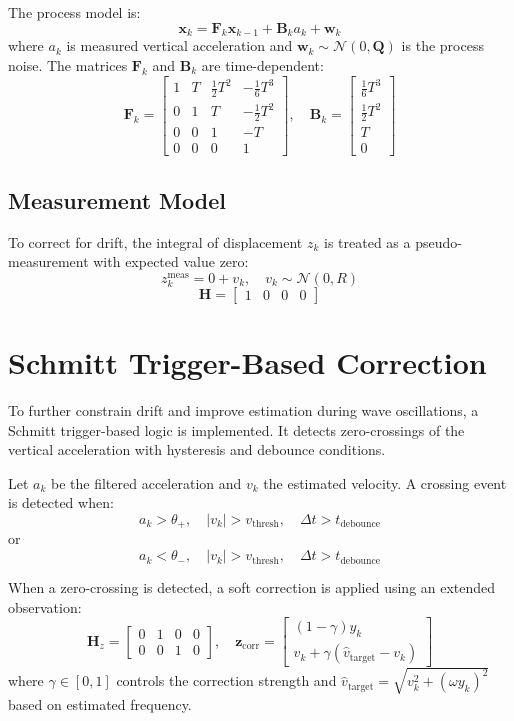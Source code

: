 \documentclass[12pt,letterpaper]{article}
\begin{document}
The process model is:
\[
\mathbf{x}_k = \mathbf{F}_k \mathbf{x}_{k-1} + \mathbf{B}_k a_k + \mathbf{w}_k
\]
where \( a_k \) is measured vertical acceleration and \( \mathbf{w}_k \sim \mathcal{N}(0, \mathbf{Q}) \) is the process noise. The matrices \( \mathbf{F}_k \) and \( \mathbf{B}_k \) are time-dependent:
\[
\mathbf{F}_k =
\begin{bmatrix}
1 & T & \frac{1}{2}T^2 & -\frac{1}{6}T^3 \\
0 & 1 & T & -\frac{1}{2}T^2 \\
0 & 0 & 1 & -T \\
0 & 0 & 0 & 1
\end{bmatrix}, \quad
\mathbf{B}_k =
\begin{bmatrix}
\frac{1}{6}T^3 \\
\frac{1}{2}T^2 \\
T \\
0
\end{bmatrix}
\]

\subsection{Measurement Model}
To correct for drift, the integral of displacement \( z_k \) is treated as a pseudo-measurement with expected value zero:
\[
z_k^\text{meas} = 0 + v_k, \quad v_k \sim \mathcal{N}(0, R)
\]
\[
\mathbf{H} = \begin{bmatrix} 1 & 0 & 0 & 0 \end{bmatrix}
\]

\section{Schmitt Trigger-Based Correction}
To further constrain drift and improve estimation during wave oscillations, a Schmitt trigger-based logic is implemented. It detects zero-crossings of the vertical acceleration with hysteresis and debounce conditions.

Let \( a_k \) be the filtered acceleration and \( v_k \) the estimated velocity. A crossing event is detected when:
\[
a_k > \theta_{+}, \quad |v_k| > v_\text{thresh}, \quad \Delta t > t_\text{debounce}
\]
or
\[
a_k < \theta_{-}, \quad |v_k| > v_\text{thresh}, \quad \Delta t > t_\text{debounce}
\]

When a zero-crossing is detected, a soft correction is applied using an extended observation:
\[
\mathbf{H}_z =
\begin{bmatrix}
0 & 1 & 0 & 0 \\
0 & 0 & 1 & 0
\end{bmatrix}, \quad
\mathbf{z}_\text{corr} =
\begin{bmatrix}
(1 - \gamma)y_k \\
v_k + \gamma(\hat{v}_\text{target} - v_k)
\end{bmatrix}
\]
where \( \gamma \in [0,1] \) controls the correction strength and \( \hat{v}_\text{target} = \sqrt{v_k^2 + (\omega y_k)^2} \) based on estimated frequency.
\end{document}
